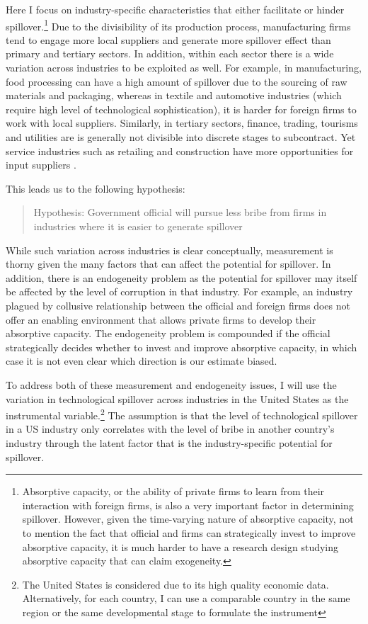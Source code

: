 Here I focus on industry-specific characteristics that either facilitate or hinder spillover.\footnote{Absorptive capacity, or the ability of private firms to learn from their interaction with foreign firms, is also a very important factor in determining spillover. However, given the time-varying nature of absorptive capacity, not to mention the fact that official and firms can strategically invest to improve absorptive capacity, it is much harder to have a research design studying absorptive capacity that can claim exogeneity.} Due to the divisibility of its production process, manufacturing firms tend to engage more local suppliers and generate more spillover effect than primary and tertiary sectors. In addition, within each sector there is a wide variation across industries to be exploited as well. For example, in manufacturing, food processing can have a high amount of spillover due to the sourcing of raw materials and packaging, whereas in textile and automotive industries (which require high level of technological sophistication), it is harder for foreign firms to work with local suppliers. Similarly, in tertiary sectors, finance, trading, tourisms and utilities are is generally not divisible into discrete stages to subcontract. Yet service industries such as retailing and construction have more opportunities for input suppliers \citep[138]{UNCTAD2001}.

This leads us to the following hypothesis:

\begin{quote}
Hypothesis: Government official will pursue less bribe from firms in industries where it is easier to generate spillover
\end{quote}

While such variation across industries is clear conceptually, measurement is thorny given the many factors that can affect the potential for spillover. In addition, there is an endogeneity problem as the potential for spillover may itself be affected by the level of corruption in that industry. For example, an industry plagued by collusive relationship between the official and foreign firms does not offer an enabling environment that allows private firms to develop their absorptive capacity. The endogeneity problem is compounded if the official strategically decides whether to invest and improve absorptive capacity, in which case it is not even clear which direction is our estimate biased.

To address both of these measurement and endogeneity issues, I will use the variation in technological spillover across industries in the United States as the instrumental variable.\footnote{The United States is considered due to its high quality economic data. Alternatively, for each country, I can use a comparable country in the same region or the same developmental stage to formulate the instrument} The assumption is that the level of technological spillover in a US industry only correlates with the level of bribe in another country's industry through the latent factor that is the industry-specific potential for spillover.

